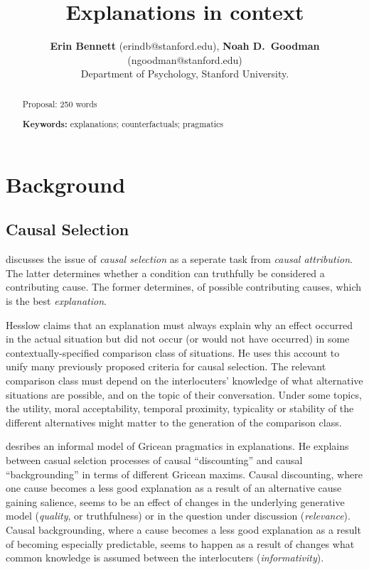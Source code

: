 \documentclass[10pt,letterpaper]{article}
\title{Explanations in context}
\author{{\large \bf Erin Bennett} (erindb@stanford.edu), {\large \bf Noah D.~Goodman} (ngoodman@stanford.edu)\\
  Department of Psychology, Stanford University.}
\begin{document}
\maketitle

\begin{abstract}

Proposal: 250 words

\textbf{Keywords:} 
explanations; counterfactuals; pragmatics
\end{abstract}

\section{Background}

\subsection{Causal Selection}

 discusses the issue of \emph{causal selection} as a seperate task from \emph{causal attribution}.
The latter determines whether a condition can truthfully be considered a contributing cause.
The former determines, of possible contributing causes, which is the best \emph{explanation}.

Hesslow claims that an explanation must always explain why an effect occurred in the actual situation but did not occur (or would not have occurred) in some contextually-specified comparison class of situations.
He uses this account to unify many previously proposed criteria for causal selection. %
The relevant comparison class must depend on the interlocuters' knowledge of what alternative situations are possible, and on the topic of their conversation.
Under some topics, the utility, moral acceptability, temporal proximity, typicality or stability of the different alternatives might matter to the generation of the comparison class.

 desribes an informal model of Gricean pragmatics in explanations.
He explains between casual selction processes of causal ``discounting'' and causal ``backgrounding'' in terms of different Gricean maxims.
Causal discounting, where one cause becomes a less good explanation as a result of an alternative cause gaining salience, seems to be an effect of changes in the underlying generative model (\emph{quality}, or truthfulness) or in the question under discussion (\emph{relevance}).
Causal backgrounding, where a cause becomes a less good explanation as a result of becoming especially predictable, seems to happen as a result of changes what common knowledge is assumed between the interlocuters (\emph{informativity}).
\end{document}
